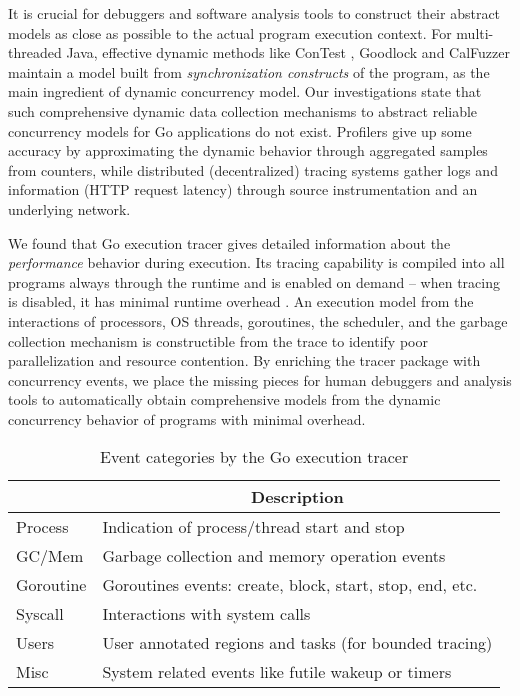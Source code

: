 It is crucial for debuggers and software analysis tools to construct their abstract models as close as possible to the actual program execution context.
%
For multi-threaded Java, effective dynamic methods like ConTest \cite{contest-jgi01}, Goodlock \cite{havelund-goodlock-spin00} and CalFuzzer \cite{joshi-calfuzzer} maintain a model built from \textit{synchronization constructs} of the program, as the main ingredient of dynamic concurrency model.
%
Our investigations state that such comprehensive dynamic data collection mechanisms to abstract reliable concurrency models for Go applications do not exist.
%
Profilers \cite{go-profile-blog} give up some accuracy by approximating the dynamic behavior through aggregated samples from counters,
%
while distributed (decentralized) tracing systems \cite{dapper} gather logs and information (\eg HTTP request latency) through source instrumentation and an underlying network.
%

We found that Go execution tracer \cite{go-cmd-trace} gives detailed information about the \textit{performance} behavior during execution.
%
Its tracing capability is compiled into all programs always through the runtime and is enabled on demand -- when tracing is disabled, it has minimal runtime overhead \cite{go-exec-tracer-doc}.
%
An execution model from the interactions of processors, OS threads, goroutines, the scheduler, and the garbage collection mechanism is constructible from the trace to identify poor parallelization and resource contention.
%
By enriching the tracer package with concurrency events, we place the missing pieces for human debuggers and analysis tools to automatically obtain comprehensive models from the dynamic concurrency behavior of programs with minimal overhead.
%

\begin{table}[b]
    \centering
        \begin{tabular}{|l|l|}
        \hline
        \rowcolor[HTML]{C0C0C0}
        \multicolumn{1}{|c|}{\cellcolor[HTML]{C0C0C0}\textbf{Category}} & \multicolumn{1}{c|}{\cellcolor[HTML]{C0C0C0}\textbf{Description}} \\ \hline
        Process & Indication of process/thread start and stop \\ \hline
        GC/Mem & Garbage collection and memory operation events\\ \hline
        Goroutine & Goroutines events: create, block, start, stop, end, etc. \\ \hline
        Syscall & Interactions with system calls \\ \hline
        Users & User annotated regions and tasks (for bounded tracing) \\ \hline
        Misc & System related events like futile wakeup or timers \\ \hline
        \end{tabular}

    \caption{Event categories by the Go execution tracer}
    \label{tab:events}
\end{table}



